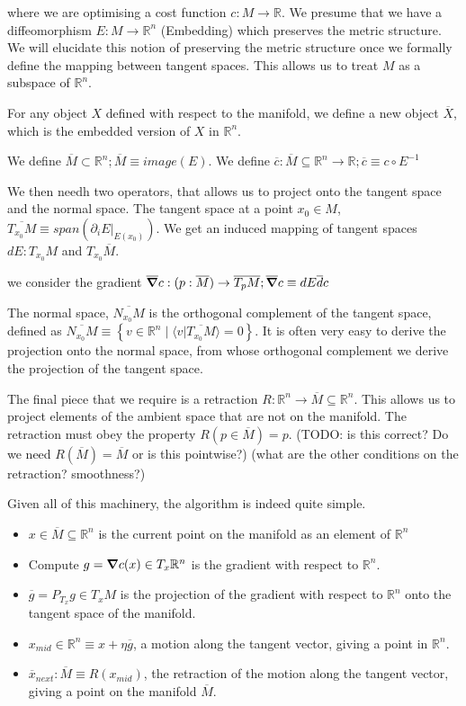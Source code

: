 \documentclass[11pt]{book}
\begin{document}
where we are optimising a cost function $c: M \rightarrow \mathbb R$.
We presume that we have a diffeomorphism $E: M \rightarrow \mathbb R^n$ (Embedding) which
preserves the metric structure. We will elucidate this notion of preserving
the metric structure once we formally define the mapping between tangent spaces.
This allows us to treat $M$ as a subspace of $\mathbb R^n$.

For any object $X$
defined with respect to the manifold, we define a new object $\overline X$, which
is the embedded version of $X$ in $\mathbb R^n$.

We define $\overline M \subset \mathbb R^n; \overline M \equiv image(E)$.
We define $\overline c: \overline M \subseteq \mathbb R^n \rightarrow \mathbb R; \overline c \equiv c \circ E^{-1}$

We then needh two operators, that allows us to project onto the tangent space
and the normal space. The tangent space at a point $x_0 \in M$, $\overline{T_{x_0} M} \equiv span(\partial_i E |_{E(x_0)})$. 
We get an induced mapping of tangent spaces $dE: T_{x_0} M$ and $T_{x_0} \overline M$.

we consider the gradient
$\overline \grad c : (p: \overline M) \rightarrow \overline{T_p M}; \overline \grad c \equiv dE \overline dc$

The normal space,
$\overline{N_{x_0} M}$ is the orthogonal complement of the tangent space, defined
as $\overline{N_{x_0} M} \equiv \left\{ v \in \mathbb R^n \mid \langle v | \overline{T_{x_0} M} \rangle = 0 \right\}$.
It is often very easy to derive the projection onto the normal space, from
whose orthogonal complement we derive the projection of the tangent space.

The final piece that we require is a retraction $R: \mathbb R^n \rightarrow \overline M \subseteq \mathbb R^n$. This allows
us to project elements of the ambient space that are not on the manifold. The
retraction must obey the property $R(p \in \overline M) = p$.
(TODO: is this correct? Do we need $R(\overline M) = \overline M$ or is this pointwise?)
(what are the other conditions on the retraction? smoothness?)

Given all of this machinery, the algorithm is indeed quite simple. 

\begin{itemize}
    \item $x \in \overline M \subseteq \mathbb R^n$ is the current point on the manifold as an element of $\mathbb R^n$
    \item Compute $g = \grad c(x) \in T_x \mathbb R^n$ is the gradient with respect to $\mathbb R^n$.
    \item $\overline g = P_{T_x} g \in T_x M$ is the projection of the gradient with respect to $\mathbb R^n$ onto the 
            tangent space of the manifold.
    \item $x_{mid}\in \mathbb R^n \equiv x + \eta \overline g$, a motion along the tangent vector, giving a point in
            $\mathbb R^n$.
    \item $\overline x_{next}: \overline M \equiv R(x_{mid})$, the retraction of the motion along the tangent vector,
        giving a point on the manifold $\overline M$.
\end{itemize}
\end{document}
